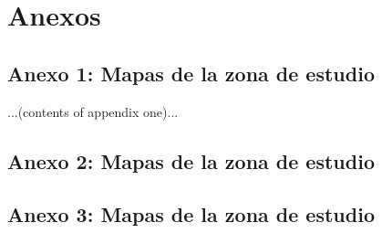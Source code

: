 \appendix
\setcounter{chapter}{5}
\renewcommand{\thechapter}{\Roman{chapter}.}
\setcounter{section}{5}%
\renewcommand{\thesection}{\arabic{chapter}.\arabic{section}}%

\chapter[ Anexos]{Anexos}
\thispagestyle{empty}

\section*{Anexo 1: Mapas de la zona de estudio}
...(contents of appendix one)...


\section*{Anexo 2: Mapas de la zona de estudio}

\section*{Anexo 3: Mapas de la zona de estudio}

